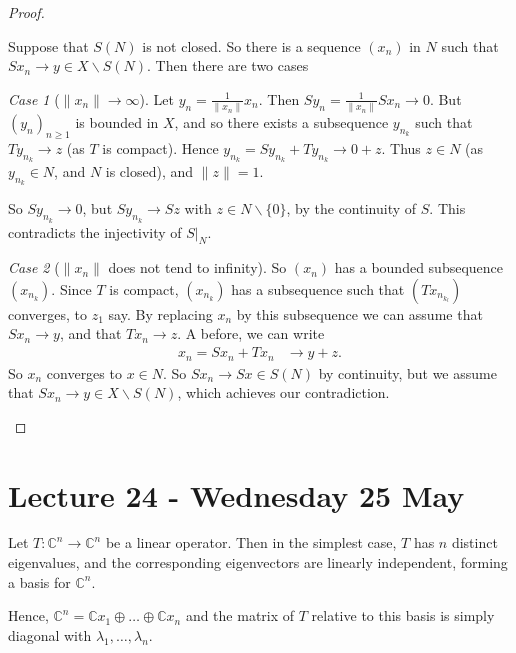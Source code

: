 \documentclass[10pt, oneside, reqno]{amsart}
\theoremstyle{plain}%
\theoremstyle{definition}
\theoremstyle{remark}
\newtheorem{case}{Case}
\newcommand{\Com}{\mathbb{C}}
\begin{document}
\begin{proof}
\begin{enumerate}[(a)]
        Suppose that $S(N)$ is not closed.  So there is a sequence $(x_n)$ in $N$ such that $Sx_n \rightarrow y \in X \backslash S(N)$. Then there are two cases
        \begin{case}[$\| x_n \| \rightarrow \infty$]  Let $y_n = \frac{1}{\| x_n \|} x_n$.  Then $Sy_n = \frac{1}{\| x_n \|} S x_n \rightarrow 0$.  But $(y_n)_{ n \geq 1}$ is bounded in $X$, and so there exists a subsequence $y_{n_k}$ such that $T y_{n_k} \rightarrow z$ (as $T$ is compact).  Hence $y_{n_k} = S y_{n_k} + T y_{n_k} \rightarrow 0 + z$.  Thus $z \in N$ (as $y_{n_k} \in N$, and $N$ is closed), and $\| z \| = 1$.  
            
            So $S y_{n_k} \rightarrow 0$, but $S y_{n_k} \rightarrow Sz$ with $z \in N \backslash \{ 0 \}$, by the continuity of $S$.  This contradicts the injectivity of $S|_N$.  
        \end{case}   
        \begin{case}[$ \| x_n \|$ does not tend to infinity]
            So $(x_n)$ has a bounded subsequence $(x_{n_k})$.  Since $T$ is compact, $(x_{n_k})$ has a subsequence such that $(T x_{n_{k_l}})$ converges, to $z_1$ say.  By replacing $x_n$ by this subsequence we can assume that $Sx_n \rightarrow y$, and that $Tx_n \rightarrow z$.  A before, we can write \begin{align*}
            x_n = S x_n + T x_n &\rightarrow y + z.
            \end{align*}  So $x_n$ converges to $x \in N$.  So $S x_n \rightarrow Sx \in S(N)$ by continuity, but we assume that $S x_n \rightarrow y \in X \backslash S(N)$, which achieves our contradiction.
        \end{case}
    \end{enumerate}  
\end{proof}

\section{Lecture 24 - Wednesday 25 May} %
\label{sec:lecture_24_wednesday_25_may}
Let $T: \Com^n \rightarrow \Com^n$ be a linear operator.  Then in the simplest case, $T$ has $n$ distinct eigenvalues, and the corresponding eigenvectors are linearly independent, forming a basis for $\Com^n$.  

Hence, $\Com^n = \Com x_1 \oplus \dots \oplus \Com x_n$ and the matrix of $T$ relative to this basis is simply diagonal with $\lambda_1, \dots, \lambda_n$.  
\end{document}
